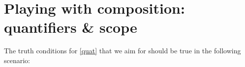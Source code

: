 \documentclass[english]{article}
\begin{document}





\section{Playing with composition: quantifiers \& scope}

The truth conditions for \cref{quat} that we aim for should be true in the following scenario:
\end{document}
